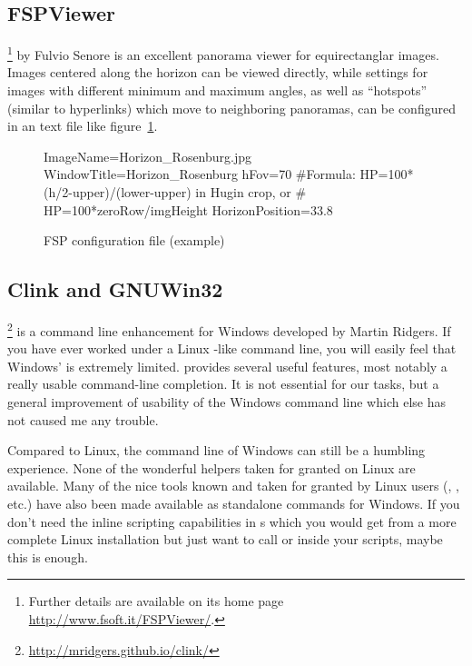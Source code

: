 \subsection{FSPViewer}
\label{sec:landscapes:FSPViewer}

\footnote{Further details are available on its home
  page \url{http://www.fsoft.it/FSPViewer/}.} by Fulvio
Senore is an excellent panorama viewer for equirectanglar
images. Images centered along the horizon can be viewed directly,
while settings for images with different minimum and maximum angles,
as well as ``hotspots'' (similar to hyperlinks) which move to
neighboring panoramas, can be configured in an  text file
like figure~\ref{fig:FSPexample}.


\begin{figure}[h]\centering
\begin{configfile}
ImageName=Horizon_Rosenburg.jpg
WindowTitle=Horizon_Rosenburg
hFov=70
#Formula: HP=100*(h/2-upper)/(lower-upper) in Hugin crop, or
#         HP=100*zeroRow/imgHeight
HorizonPosition=33.8
\end{configfile}
\caption{FSP configuration file (example)}
\label{fig:FSPexample}
\end{figure}

\subsection{Clink and GNUWin32}
\label{sec:landscapes:clink}

\footnote{\url{http://mridgers.github.io/clink/}} is a command
line enhancement for Windows developed by Martin Ridgers. If you have
ever worked under a Linux -like command line, you will
easily feel that Windows'  is extremely limited. 
provides several useful features, most notably a really usable
command-line completion. It is not essential for our tasks, but a
general improvement of usability of the Windows command line which
else has not caused me any trouble.

Compared to Linux, the command line of Windows can still be a humbling
experience. None of the wonderful helpers taken for granted on Linux
are available.  Many of the nice tools known and taken for granted by
Linux users (, ,  etc.) have
also been made available as standalone commands for Windows. If you
don't need the inline scripting capabilities in s which
you would get from a more complete Linux installation but just want to
call  or  inside your 
scripts, maybe this is enough.

